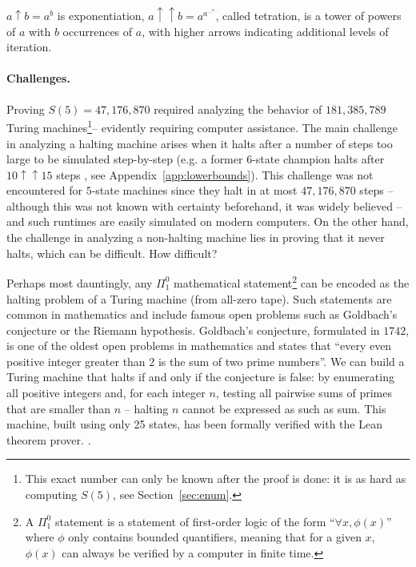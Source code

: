 \documentclass[a4paper,british]{article}
\theoremstyle{definition} %
\numberwithin{equation}{section}
\theoremstyle{definition} %
\newcommand{\BBtheFifth}{47{,}176{,}870}
\newcommand{\BBtheFifthTNF}{181{,}385{,}789}
\begin{document}
\begin{table}[h]
{        $a \uparrow b = a^b$ is exponentiation,
        $a \uparrow\uparrow b = a^{a^{\dots^a}}$, called tetration, is a tower of powers of $a$ with $b$ occurrences of $a$,
        with higher arrows indicating additional levels of iteration.
    }
    \label{table:landscape}
\end{table}











\paragraph{Challenges.} Proving $S(5) = \BBtheFifth$ required analyzing the behavior of $\BBtheFifthTNF$ Turing machines\footnote{This exact number can only be known after the proof is done: it is as hard as computing $S(5)$, see Section~\ref{sec:enum}.}-- evidently requiring computer assistance. The main challenge in analyzing a halting machine arises when it halts after a number of steps too large to be simulated step-by-step (e.g. a former $6$-state champion halts after $10 \uparrow \uparrow 15$ steps \cite{Pavel_discorvery}, see Appendix~\ref{app:lowerbounds}). This challenge was not encountered for $5$-state machines since they halt in at most $\BBtheFifth$ steps -- although this was not known with certainty beforehand, it was widely believed -- and such runtimes are easily simulated on modern computers. On the other hand, the challenge in analyzing a non-halting machine lies in proving that it never halts, which can be difficult. How difficult?

Perhaps most dauntingly, any $\Pi_1^0$ mathematical statement\footnote{A $\Pi_1^0$ statement is a statement of first-order logic of the form ``$\forall x, \phi(x)$'' where $\phi$ only contains bounded quantifiers, meaning that for a given $x$, $\phi(x)$ can always be verified by a computer in finite time.} can be encoded as the halting problem of a Turing machine (from all-zero tape). Such statements are common in mathematics and include famous open problems such as Goldbach's conjecture or the Riemann hypothesis. Goldbach's conjecture, formulated in $1742$, is one of the oldest open problems in mathematics and states that ``every even positive integer greater than $2$ is the sum of two prime numbers''. We can build a Turing machine that halts if and only if the conjecture is false: by enumerating all positive integers and, for each integer $n$, testing all pairwise sums of primes that are smaller than $n$ -- halting $n$ cannot be expressed as such as sum. This machine, built using only 25 states, has been formally verified with the Lean theorem prover. \cite{GoldbachTM27, GoldbachTM25, DeMouraKongAvigadVanDoornvonRaumer}.
\end{document}
